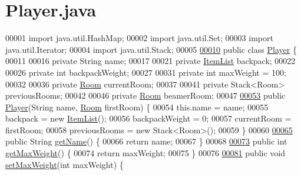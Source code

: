 \hypertarget{Player_8java_source}{\section{Player.\-java}
}

\begin{DoxyCode}
00001 \textcolor{keyword}{import} java.util.HashMap;
00002 \textcolor{keyword}{import} java.util.Set;
00003 \textcolor{keyword}{import} java.util.Iterator;
00004 \textcolor{keyword}{import} java.util.Stack;
00005 
\hypertarget{Player_8java_source_l00010}{}\hyperlink{classPlayer}{00010} \textcolor{keyword}{public} \textcolor{keyword}{class }\hyperlink{classPlayer}{Player} \{
00011 
00016     \textcolor{keyword}{private} String name;
00017 
00021     \textcolor{keyword}{private} \hyperlink{classItemList}{ItemList} backpack;
00022 
00026     \textcolor{keyword}{private} \textcolor{keywordtype}{int} backpackWeight;
00027 
00031     \textcolor{keyword}{private} \textcolor{keywordtype}{int} maxWeight = 100;
00032 
00036     \textcolor{keyword}{private} \hyperlink{classRoom}{Room} currentRoom;
00037 
00041     \textcolor{keyword}{private} Stack<Room> previousRooms;
00042 
00046     \textcolor{keyword}{private} \hyperlink{classRoom}{Room} beamerRoom;
00047 
\hypertarget{Player_8java_source_l00053}{}\hyperlink{classPlayer_aa0b4d27c6fa66ab36c3d870eb5f4709a}{00053}     \textcolor{keyword}{public} \hyperlink{classPlayer_aa0b4d27c6fa66ab36c3d870eb5f4709a}{Player}(String name, \hyperlink{classRoom}{Room} firstRoom) \{
00054         this.name = name;
00055         backpack = \textcolor{keyword}{new} \hyperlink{classItemList}{ItemList}();
00056         backpackWeight = 0;
00057         currentRoom = firstRoom;
00058         previousRooms = \textcolor{keyword}{new} Stack<Room>();
00059     \}
00060 
\hypertarget{Player_8java_source_l00065}{}\hyperlink{classPlayer_a7b17595bbe9876d4aa469ad9bee644dd}{00065}     \textcolor{keyword}{public} String \hyperlink{classPlayer_a7b17595bbe9876d4aa469ad9bee644dd}{getName}() \{
00066         \textcolor{keywordflow}{return} name;
00067     \}
00068 
\hypertarget{Player_8java_source_l00073}{}\hyperlink{classPlayer_a29c09bad98b48579fec4321698e082d1}{00073}     \textcolor{keyword}{public} \textcolor{keywordtype}{int} \hyperlink{classPlayer_a29c09bad98b48579fec4321698e082d1}{getMaxWeight}() \{
00074         \textcolor{keywordflow}{return} maxWeight;
00075     \}
00076 
\hypertarget{Player_8java_source_l00081}{}\hyperlink{classPlayer_a000b1e49bc833a5cffc2a14441c01498}{00081}     \textcolor{keyword}{public} \textcolor{keywordtype}{void} \hyperlink{classPlayer_a000b1e49bc833a5cffc2a14441c01498}{setMaxWeight}(\textcolor{keywordtype}{int} maxWeight) \{

\end{DoxyCode}
